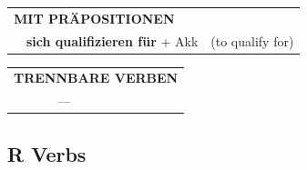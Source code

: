 \documentclass[10pt,a4paper]{revtex4-2}
\begin{document}
\begin{verbbox-acc}
\vspace{10pt}

\begin{tabular}{lll}
\multicolumn{3}{l}{\textbf{MIT PRÄPOSITIONEN}}\\
& \textbf{sich qualifizieren für} + Akk & (to qualify for)\\
\end{tabular}
\hfill
\begin{tabular}{lll}
\multicolumn{3}{l}{\textbf{TRENNBARE VERBEN}}\\
& ---\\
\end{tabular}

\vspace{-5pt}
\end{verbbox-acc}

\subsection{R Verbs}
\end{document}
